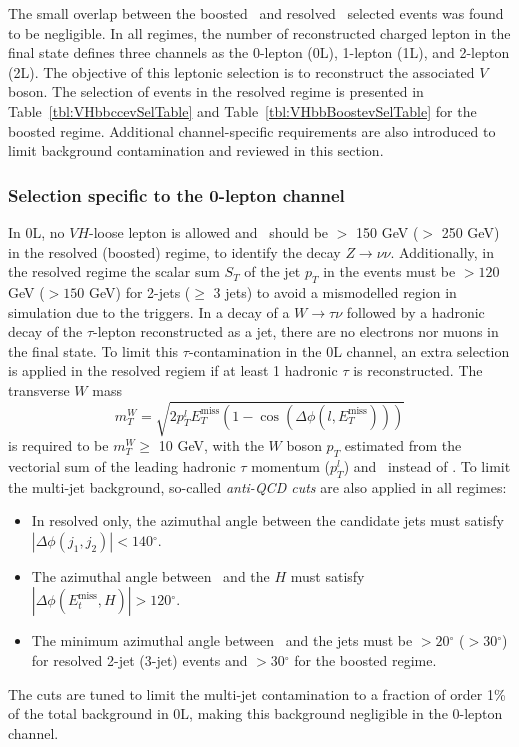 The small overlap between the boosted \vhb\ and resolved \vhc\ selected events was found to be negligible. In all regimes, the number of reconstructed charged lepton in the final state defines three channels as the 0-lepton (0L), 1-lepton (1L), and 2-lepton (2L). The objective of this leptonic selection is to reconstruct the associated $V$ boson. The selection of events in the resolved regime is presented in Table~\ref{tbl:VHbbccevSelTable} and Table~\ref{tbl:VHbbBoostevSelTable} for the boosted regime. Additional channel-specific requirements are also introduced to limit background contamination and reviewed in this section.

\subsubsection{Selection specific to the 0-lepton channel}\label{subsubsec-0Lsel}
In 0L, no $VH$-loose lepton is allowed and \etm\ should be $>$ 150 GeV ($>$ 250 GeV) in the resolved (boosted) regime, to identify the decay $Z \rightarrow \nu\nu$. Additionally, in the resolved regime the scalar sum $S_T$ of the jet $p_T$ in the events must be $> 120$ GeV ($> 150$ GeV) for 2-jets ($\geq$ 3 jets) to avoid a mismodelled region in simulation due to the triggers. In a decay of a $W \rightarrow \tau \nu$ followed by a hadronic decay of the $\tau$-lepton reconstructed as a jet, there are no electrons nor muons in the final state. To limit this $\tau$-contamination in the 0L channel, an extra selection is applied in the resolved regiem if at least 1 hadronic $\tau$ is reconstructed. The transverse $W$ mass \[ m_T^W = \sqrt{2 p_T^l E_T^{\textrm{miss}} (1 - \cos(\Delta \phi(l, E_T^{\textrm{miss}} ) ) ) } \] is required to be $m_T^W \geq$ 10 GeV, with the $W$ boson $p_T$ estimated from the vectorial sum of the leading hadronic $\tau$ momentum ($p_T^l$) and \etm\ instead of \ptv. To limit the multi-jet background, so-called \textit{anti-QCD cuts} are also applied in all regimes:
\begin{itemize}
    \item In resolved only, the azimuthal angle between the candidate jets must satisfy $|\Delta \phi(j_1, j_2)| < 140 \ensuremath{^\circ}$.
    \item The azimuthal angle between \etm\ and the $H$ must satisfy $|\Delta \phi(E_t^{\textrm{miss}}, H)| > 120 \ensuremath{^\circ}$.
    \item The minimum azimuthal angle between \etm\ and the jets must be $> 20\ensuremath{^\circ}$ ($> 30 \ensuremath{^\circ}$) for resolved 2-jet (3-jet) events and $> 30\ensuremath{^\circ}$ for the boosted regime.
\end{itemize}
The cuts are tuned to limit the multi-jet contamination to a fraction of order 1\% of the total background in 0L, making this background negligible in the 0-lepton channel. 

